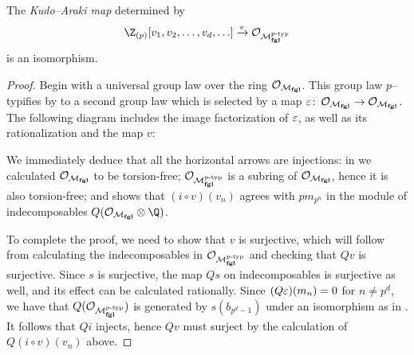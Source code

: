 \begin{theorem}\label{KudoArakiIsomorphism}
The \textit{Kudo--Araki map} determined by  \[\Z_{(p)}[v_1, v_2, \ldots, v_d, \ldots] \xrightarrow{v} \sheaf O_{\moduli{fgl}^{\ptyp}}\] is an isomorphism.
\end{theorem}
\begin{proof}
Begin with a universal group law over the ring $\mathcal{O}_{\mathcal{M}_{\mathbf{fgl}}}$.  This group law $p$--typifies by  to a second group law which is selected by a map $\varepsilon\colon\thinspace \mathcal{O}_{\mathcal{M}_{\mathbf{fgl}}} \to \mathcal{O}_{\mathcal{M}_{\mathbf{fgl}}}$.  The following diagram includes the image factorization of $\varepsilon$, as well as its rationalization and the map $v$:
\begin{center}
\end{center}
We immediately deduce that all the horizontal arrows are injections: in  we calculated $\mathcal{O}_{\mathcal{M}_{\mathbf{fgl}}}$ to be torsion-free; $\mathcal{O}_{\mathcal{M}_{\mathbf{fgl}}^{p\text{-}\mathrm{typ}}}$ is a subring of $\mathcal{O}_{\mathcal{M}_{\mathbf{fgl}}}$, hence it is also torsion-free; and  shows that $(i \circ v)(v_n)$ agrees with $pm_{p^n}$ in the module of indecomposables $Q(\sheaf O_{\moduli{fgl}} \otimes \Q)$.

To complete the proof, we need to show that $v$ is surjective, which will follow from calculating the indecomposables in $\mathcal{O}_{\mathcal{M}_{\mathbf{fgl}}^{p\text{-}\mathrm{typ}}}$ and checking that $Qv$ is surjective.  Since $s$ is surjective, the map $Qs$ on indecomposables is surjective as well, and its effect can be calculated rationally.  Since $(Q\varepsilon)(m_n) = 0$ for $n \ne p^d$, we have that $Q(\mathcal{O}_{\mathcal{M}_{\mathbf{fgl}}^{p\text{-}\mathrm{typ}}})$ is generated by $s(b_{p^d-1})$ under an isomorphism as in .  It follows that $Qi$ injects, hence $Qv$ must surject by the calculation of $Q(i \circ v)(v_n)$ above.
\end{proof}

